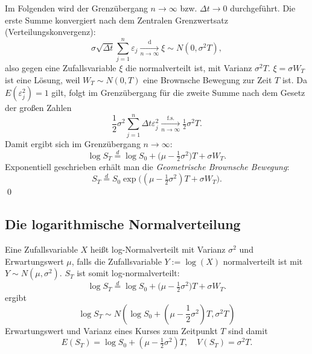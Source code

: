 Im Folgenden wird der Grenzübergang $n \longrightarrow \infty$ bzw. $\Delta t \longrightarrow 0$ durchgeführt. 
Die erste Summe konvergiert nach dem Zentralen Grenzwertsatz (Verteilungskonvergenz):
$$
\sigma \sqrt{\Delta t} \sum_{j=1}^n \varepsilon_j  \xrightarrow[n \to \infty]{\mathrm{d}} \xi \sim N(0, \sigma^2 T),
$$
also gegen eine Zufallsvariable $\xi$ die normalverteilt ist, mit Varianz $\sigma^2 T$.  $\xi = \sigma W_T$ ist eine Lösung, 
weil $W_T \sim N(0, T)$ eine Brownsche Bewegung zur Zeit $T$ ist. 
Da $E(\varepsilon_j^2) = 1$ gilt, folgt im Grenzübergang für die zweite Summe nach dem Gesetz der großen Zahlen
$$
\frac{1}{2} \sigma^2 \sum_{j=1}^{n} \Delta t \varepsilon_j^2  \xrightarrow[n \to \infty]{\mathrm{f.s.}} \tfrac12 \sigma^2 T.
$$
Damit ergibt sich im Grenzübergang $n \to \infty$:
$$
\log S_T \overset{d} = \log S_0 + \big(\mu - \tfrac12 \sigma^2\big)T + \sigma W_T.
$$Exponentiell geschrieben erhält man die \textit{Geometrische Brownsche Bewegung}:
$$
S_T \overset d = S_0 \exp\!\Big( (\mu - \tfrac12 \sigma^2)T + \sigma W_T \Big).
$$
\qed
\subsection{Die logarithmische Normalverteilung}

Eine Zufallsvariable $X$ heißt log-Normalverteilt mit Varianz $\sigma^2$ und Erwartungswert $\mu$, 
falls die Zufallsvariable $Y := \log(X)$ normalverteilt ist mit $Y \sim N(\mu, \sigma^2)$.
$S_T$ ist somit log-normalverteilt:
$$\log S_T \overset{d} = \log S_0 + \big(\mu - \tfrac12 \sigma^2\big)T + \sigma W_T.$$
ergibt
$$\log S_T \sim N\left( \log S_0 + \left( \mu - \frac{1}{2} \sigma^2 \right)T , \sigma^2 T\right)$$
Erwartungswert und Varianz eines Kurses zum Zeitpunkt $T$ sind damit
$$E(S_T)=\log S_0 + (\mu - \tfrac12 \sigma^2)T, \quad V(S_T)=\sigma^2 T.$$
